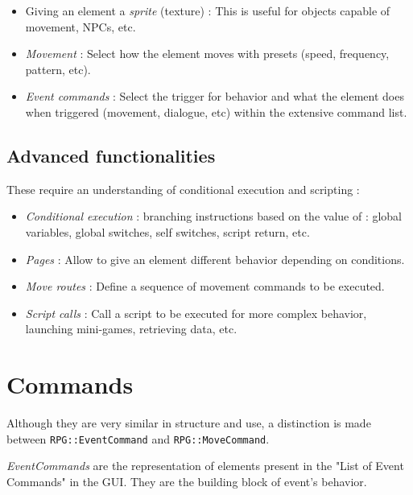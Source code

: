 \documentclass[11pt]{article}
\begin{document}
\begin{itemize}
	\item Giving an element a \textit{sprite} (texture) : This is useful for objects capable of movement, NPCs, etc.
	
	\item \textit{Movement} : Select how the element moves with presets (speed, frequency, pattern, etc).
	
	\item \textit{Event commands} : Select the trigger for behavior and what the element does when triggered (movement, dialogue, etc) within the extensive command list.
\end{itemize}

\subsection{Advanced functionalities}

These require an understanding of conditional execution and scripting :

\begin{itemize}
	\item \textit{Conditional execution} : branching instructions based on the value of : global variables, global switches, self switches, script return, etc.
	
	\item \textit{Pages} : Allow to give an element different behavior depending on conditions.
	
	\item \textit{Move routes} : Define a sequence of movement commands to be executed.
	
	\item \textit{Script calls} : Call a script to be executed for more complex behavior, launching mini-games, retrieving data, etc.
\end{itemize}



\newpage
\section{Commands}

Although they are very similar in structure and use, a distinction is made between \verb|RPG::EventCommand| and \verb|RPG::MoveCommand|.

\textit{EventCommands} are the representation of elements present in the "List of Event Commands" in the GUI. They are the building block of event's behavior.
\end{document}

